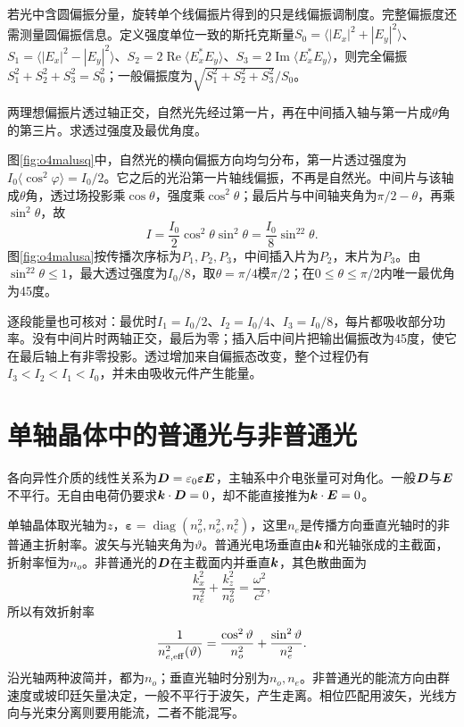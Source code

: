 若光中含圆偏振分量，旋转单个线偏振片得到的只是线偏振调制度。完整偏振度还需测量圆偏振信息。定义强度单位一致的斯托克斯量$S_0=\langle|E_x|^2+|E_y|^2\rangle$、$S_1=\langle|E_x|^2-|E_y|^2\rangle$、$S_2=2\operatorname{Re}\langle E_x^*E_y\rangle$、$S_3=2\operatorname{Im}\langle E_x^*E_y\rangle$，则完全偏振$S_1^2+S_2^2+S_3^2=S_0^2$；一般偏振度为$\sqrt{S_1^2+S_2^2+S_3^2}/S_0$。

\begin{example}\label{ex:o4malus}
两理想偏振片透过轴正交，自然光先经过第一片，再在中间插入轴与第一片成$\theta$角的第三片。求透过强度及最优角度。
\end{example}
\begin{solution}
图\ref{fig:o4malusq}中，自然光的横向偏振方向均匀分布，第一片透过强度为$I_0\langle\cos^2\varphi\rangle=I_0/2$。它之后的光沿第一片轴线偏振，不再是自然光。中间片与该轴成$\theta$角，透过场投影乘$\cos\theta$，强度乘$\cos^2\theta$；最后片与中间轴夹角为$\pi/2-\theta$，再乘$\sin^2\theta$，故
\[
 I=\frac{I_0}{2}\cos^2\theta\sin^2\theta
 =\frac{I_0}{8}\sin^22\theta.
\]
图\ref{fig:o4malusa}按传播次序标为$P_1,P_2,P_3$，中间插入片为$P_2$，末片为$P_3$。由$\sin^22\theta\leq1$，最大透过强度为$I_0/8$，取$\theta=\pi/4$模$\pi/2$；在$0\leq\theta\leq\pi/2$内唯一最优角为45度。

逐段能量也可核对：最优时$I_1=I_0/2$、$I_2=I_0/4$、$I_3=I_0/8$，每片都吸收部分功率。没有中间片时两轴正交，最后为零；插入后中间片把输出偏振改为45度，使它在最后轴上有非零投影。透过增加来自偏振态改变，整个过程仍有$I_3<I_2<I_1<I_0$，并未由吸收元件产生能量。
\end{solution}

\section{单轴晶体中的普通光与非普通光}\label{th:o4crystal}
各向异性介质的线性关系为$\bm{D}=\varepsilon_0\boldsymbol\varepsilon\bm{E}$，主轴系中介电张量可对角化。一般$\bm{D}$与$\bm{E}$不平行。无自由电荷仍要求$\bm{k}\cdot\bm{D}=0$，却不能直接推为$\bm{k}\cdot\bm{E}=0$。

单轴晶体取光轴为$z$，$\boldsymbol\varepsilon=\operatorname{diag}(n_o^2,n_o^2,n_e^2)$，这里$n_e$是传播方向垂直光轴时的非普通主折射率。波矢与光轴夹角为$\vartheta$。普通光电场垂直由$\bm{k}$和光轴张成的主截面，折射率恒为$n_o$。非普通光的$\bm{D}$在主截面内并垂直$\bm{k}$，其色散曲面为
\[
 \frac{k_x^2}{n_e^2}+\frac{k_z^2}{n_o^2}=\frac{\omega^2}{c^2},
\]
所以有效折射率
\[
 \frac1{n_{e,\rm eff}^2(\vartheta)}=
 \frac{\cos^2\vartheta}{n_o^2}+\frac{\sin^2\vartheta}{n_e^2}.
\]
沿光轴两种波简并，都为$n_o$；垂直光轴时分别为$n_o,n_e$。非普通光的能流方向由群速度或坡印廷矢量决定，一般不平行于波矢，产生走离。相位匹配用波矢，光线方向与光束分离则要用能流，二者不能混写。

